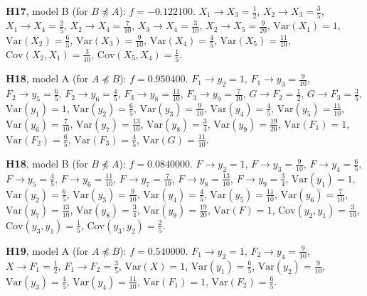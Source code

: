 \documentclass[10pt,a4paper]{article}
\newcommand{\nnest}{\not\preceq}
\begin{document}
{\noindent\textbf{H17}, model B (for $B\nnest A$): $f=-0.122100$. {\footnotesize $X_{1}\to X_{3}=\tfrac{1}{2}$, $X_{2}\to X_{3}=\tfrac{3}{5}$, $X_{1}\to X_{4}=\tfrac{2}{5}$, $X_{2}\to X_{4}=\tfrac{7}{10}$, $X_{3}\to X_{4}=\tfrac{3}{10}$, $X_{2}\to X_{5}=\tfrac{9}{20}$, $\mathrm{Var}(X_{1})=1$, $\mathrm{Var}(X_{2})=\tfrac{6}{5}$, $\mathrm{Var}(X_{3})=\tfrac{9}{10}$, $\mathrm{Var}(X_{4})=\tfrac{4}{5}$, $\mathrm{Var}(X_{5})=\tfrac{11}{10}$, $\mathrm{Cov}(X_{2},X_{1})=\tfrac{3}{10}$, $\mathrm{Cov}(X_{5},X_{4})=\tfrac{1}{5}$.}\par\smallskip
\noindent\textbf{H18}, model A (for $A\nnest B$): $f=0.950400$. {\footnotesize $F_{1}\to y_{2}=1$, $F_{1}\to y_{3}=\tfrac{9}{10}$, $F_{2}\to y_{5}=\tfrac{6}{5}$, $F_{2}\to y_{6}=\tfrac{4}{5}$, $F_{3}\to y_{8}=\tfrac{11}{10}$, $F_{3}\to y_{9}=\tfrac{7}{10}$, $G\to F_{2}=\tfrac{1}{2}$, $G\to F_{3}=\tfrac{3}{5}$, $\mathrm{Var}(y_{1})=1$, $\mathrm{Var}(y_{2})=\tfrac{6}{5}$, $\mathrm{Var}(y_{3})=\tfrac{9}{10}$, $\mathrm{Var}(y_{4})=\tfrac{4}{5}$, $\mathrm{Var}(y_{5})=\tfrac{11}{10}$, $\mathrm{Var}(y_{6})=\tfrac{7}{10}$, $\mathrm{Var}(y_{7})=\tfrac{13}{10}$, $\mathrm{Var}(y_{8})=\tfrac{3}{4}$, $\mathrm{Var}(y_{9})=\tfrac{19}{20}$, $\mathrm{Var}(F_{1})=1$, $\mathrm{Var}(F_{2})=\tfrac{6}{5}$, $\mathrm{Var}(F_{3})=\tfrac{4}{5}$, $\mathrm{Var}(G)=\tfrac{11}{10}$.}\par\smallskip
\noindent\textbf{H18}, model B (for $B\nnest A$): $f=0.0840000$. {\footnotesize $F\to y_{2}=1$, $F\to y_{3}=\tfrac{9}{10}$, $F\to y_{4}=\tfrac{6}{5}$, $F\to y_{5}=\tfrac{4}{5}$, $F\to y_{6}=\tfrac{11}{10}$, $F\to y_{7}=\tfrac{7}{10}$, $F\to y_{8}=\tfrac{13}{10}$, $F\to y_{9}=\tfrac{3}{4}$, $\mathrm{Var}(y_{1})=1$, $\mathrm{Var}(y_{2})=\tfrac{6}{5}$, $\mathrm{Var}(y_{3})=\tfrac{9}{10}$, $\mathrm{Var}(y_{4})=\tfrac{4}{5}$, $\mathrm{Var}(y_{5})=\tfrac{11}{10}$, $\mathrm{Var}(y_{6})=\tfrac{7}{10}$, $\mathrm{Var}(y_{7})=\tfrac{13}{10}$, $\mathrm{Var}(y_{8})=\tfrac{3}{4}$, $\mathrm{Var}(y_{9})=\tfrac{19}{20}$, $\mathrm{Var}(F)=1$, $\mathrm{Cov}(y_{2},y_{1})=\tfrac{3}{10}$, $\mathrm{Cov}(y_{3},y_{1})=\tfrac{1}{5}$, $\mathrm{Cov}(y_{3},y_{2})=\tfrac{2}{5}$.}\par\smallskip
\noindent\textbf{H19}, model A (for $A\nnest B$): $f=0.540000$. {\footnotesize $F_{1}\to y_{2}=1$, $F_{2}\to y_{4}=\tfrac{9}{10}$, $X\to F_{1}=\tfrac{1}{2}$, $F_{1}\to F_{2}=\tfrac{3}{5}$, $\mathrm{Var}(X)=1$, $\mathrm{Var}(y_{1})=\tfrac{6}{5}$, $\mathrm{Var}(y_{2})=\tfrac{9}{10}$, $\mathrm{Var}(y_{3})=\tfrac{4}{5}$, $\mathrm{Var}(y_{4})=\tfrac{11}{10}$, $\mathrm{Var}(F_{1})=1$, $\mathrm{Var}(F_{2})=\tfrac{6}{5}$.}\par\smallskip
}
\end{document}
